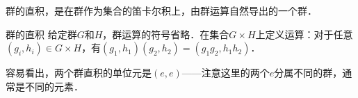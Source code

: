 
群的直积，是在群作为集合的笛卡尔积上，由群运算自然导出的一个群．

\begin{definition}{群的直积}
给定群$G$和$H$，群运算的符号省略．在集合$G\times H$上定义运算：对于任意$(g_i, h_i)\in G\times H$，有$(g_1, h_1)(g_2, h_2)=(g_1g_2, h_1h_2)$．
\end{definition}

容易看出，两个群直积的单位元是$(e, e)$——注意这里的两个$e$分属不同的群，通常是不同的元素．
